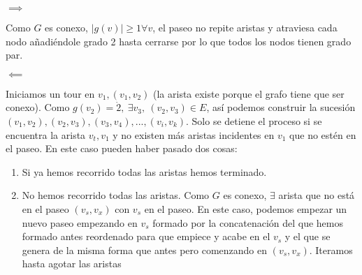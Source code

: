 \documentclass[openany]{book}
\begin{document}
\begin{demonstration}
    
    $ \implies $
    
    Como $ G $ es conexo, $ |g(v)| \geq 1 \forall v$, el paseo no repite aristas y atraviesa cada nodo añadiéndole grado 2 hasta cerrarse por lo que todos los nodos tienen grado par.

    $ \impliedby $
    
    Iniciamos un tour en $ v_1, (v_1,v_2)$ (la arista existe porque el grafo tiene que ser conexo). Como $ g(v_2) = \dot{2},\ \exists v_3,\ (v_2,v_3) \in E$, así podemos construir la sucesión $ (v_1,v_2),(v_2,v_3),(v_3,v_4),...,(v_i,v_{k}) $. Solo se detiene el proceso si se encuentra la arista $ v_{t},v_1 $ y no existen más aristas incidentes en $ v_1 $ que no estén en el paseo. En este caso pueden haber pasado dos cosas:

    \begin{enumerate}
        \item Si ya hemos recorrido todas las aristas hemos terminado.
        \item No hemos recorrido todas las aristas. Como $ G $ es conexo, $ \exists $ arista que no está en el paseo $ (v_{s},v_{x}) $ con $ v_{s} $ en el paseo. En este caso, podemos empezar un nuevo paseo empezando en $ v_{s} $ formado por la concatenación del que hemos formado antes reordenado para que empiece y acabe en el $ v_{s} $ y el que se genera de la misma forma que antes pero comenzando en $ (v_{s},v_{x}) $. Iteramos hasta agotar las aristas
    \end{enumerate}

\end{demonstration}









\end{document}

